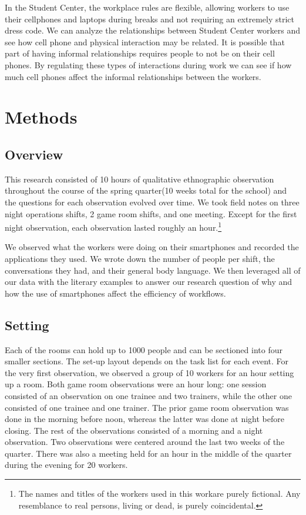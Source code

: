 \documentclass[letterpaper, 12pt]{report}
\begin{document}
	In the Student Center, the workplace rules are flexible, allowing workers to use their cellphones and laptops during breaks and not requiring an extremely strict dress code. We can analyze the relationships between Student Center workers and see how cell phone  and physical interaction may be related. It is possible that part of having informal relationships requires people to not be on their cell phones. By regulating these types of interactions during work we can see if how much cell phones affect the informal relationships between the workers.
	
	\section{Methods}
	\subsection{Overview}

	This research consisted of 10 hours of qualitative ethnographic observation throughout the course of the spring quarter(10 weeks total for the school) and the questions for each observation evolved over time. We took field notes on three night operations shifts, 2 game room shifts, and one meeting. Except for the first night observation, each observation lasted roughly an hour.\footnote{The names and titles of the workers used in this workare purely fictional. Any resemblance to real persons, living or dead, is purely coincidental.}
	
	We observed what the workers were doing on their smartphones and recorded the applications they used.  We wrote down the number of people per shift, the conversations they had, and their general body language. We then leveraged all of our data with the literary examples to answer our research question of why and how the use of smartphones affect the efficiency of workflows.
	
	\subsection{Setting}
	Each of the rooms can hold up to 1000 people and can be sectioned into four smaller sections. The set-up layout depends on the task list for each event. For the very first observation, we observed a group of 10 workers for an hour setting up a room. Both game room observations were an hour long: one session consisted of an observation on one trainee and two trainers, while the other one consisted of one trainee and one trainer. The prior game room observation was done in the morning before noon, whereas the latter was done at night before closing. The rest of the observations consisted of a morning and a night observation. Two observations were centered around the last two weeks of the quarter. There was also a meeting held for an hour in the middle of the quarter during the evening for 20 workers.
	
\end{document}
